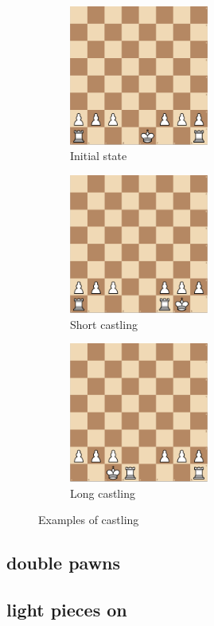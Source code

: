 \documentclass[a4paper,openany]{uantwerpenassignment}
\begin{document}
\begin{figure}[h]
    \centering
    \begin{subfigure}{.3\textwidth}
        \includegraphics[width=130pt]{images/castling1.png}
        \caption{Initial state}
        \label{fig:castling1}
    \end{subfigure}
    \begin{subfigure}{.3\textwidth}
        \includegraphics[width=130pt]{images/castling2.png}
        \caption{Short castling}
        \label{fig:castling2}
    \end{subfigure}
    \begin{subfigure}{.3\textwidth}
        \includegraphics[width=130pt]{images/castling3.png}
        \caption{Long castling}
        \label{fig:castling3}
    \end{subfigure}
    \caption{Examples of castling}
    \label{fig:castling}
\end{figure}

\subsection{double pawns}
\subsection{light pieces on }
\end{document}
